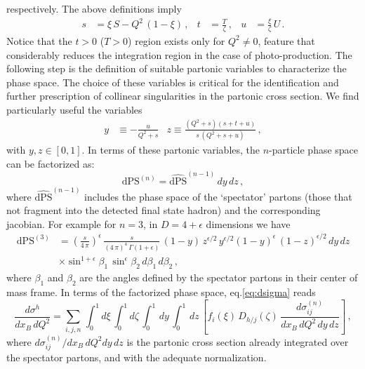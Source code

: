 \documentclass[superscriptaddress,showkeys,showpacs]{revtex4}
\begin{document}
respectively. The above definitions imply
\begin{align}
s&=\xi\,S-Q^2\,(1-\xi)\,,&
t&=\frac{T}{\zeta}\,,& 
u&=\frac{\xi}{\zeta}\,U\,.\label{eq:ph3}
\end{align}
Notice that the $t>0$ ($T>0$) region exists only for $Q^2\neq 0$, feature 
that considerably reduces the integration region in the case of 
photo-production. The following step is the definition of suitable partonic 
variables to characterize the phase space. The choice of these variables is 
critical for the identification and further prescription of collinear 
singularities in the partonic cross section. We find particularly useful the
variables
\begin{align}
y&\equiv-\frac{u}{Q^2+s}&z\equiv\frac{(Q^2+s)(s+t+u)}
{s\,(Q^2+s+u)}\,,
\end{align}
with $y,z\in[0,1]$.
In terms of these partonic variables, the $n$-particle phase space can be
factorized as:
\begin{equation}\label{eq:dPS}
\mbox{dPS}^{(n)}=\widehat{\mbox{dPS}}^{(n-1)}\,dy\,dz\,,
\end{equation}
where $\widehat{\mbox{dPS}}^{(n-1)}$ includes the phase space of the `spectator'
partons (those that not fragment into the detected final state hadron) and 
the corresponding jacobian. 
For example for $n=3$, in $D=4+\epsilon$ dimensions we have
\begin{equation}\label{eq:dPS3}
\begin{split}
\mbox{dPS}^{(3)}&=\left(\frac{s}{4\,\pi}\right)^{\epsilon}\,
\frac{s}{(4\,\pi)^4\,\Gamma(1+\epsilon)}
\,(1-y)\,z^{\epsilon/2}\,y^{\epsilon/2}(1-y)^{\epsilon}\,(1-z)^{\epsilon/2}\,
dy\,dz\\
&\times\sin^{1+\epsilon}\beta_1\,\sin^\epsilon\beta_2\,d\beta_1\,d\beta_2\,,
\end{split}
\end{equation}
where $\beta_1$ and $\beta_2$ are the angles defined by the spectator partons
in their center of mass frame. In terms of the factorized phase space, 
eq.\eqref{eq:dsigma} reads
\begin{equation}\label{eq:s1}
\frac{d\sigma^{h}}{dx_B\,dQ^2}=\sum_{i,j,n}\,\int_{0}^{1}d\xi\,\int_{0}^{1}d\zeta\,\int_0^1 
\,dy\,\int_0^1\,dz\,\left[f_i(\xi)\,D_{h/j}(\zeta)\,\frac{
d\sigma^{(n)}_{ij}}{dx_B\,dQ^2\,dy\,dz}\right]\,,
\end{equation}
where $d\sigma^{(n)}_{ij}/dx_B\,dQ^2 dy\,dz$  is the partonic cross section 
already integrated over the spectator partons, and with the adequate  
normalization. 
\end{document}
